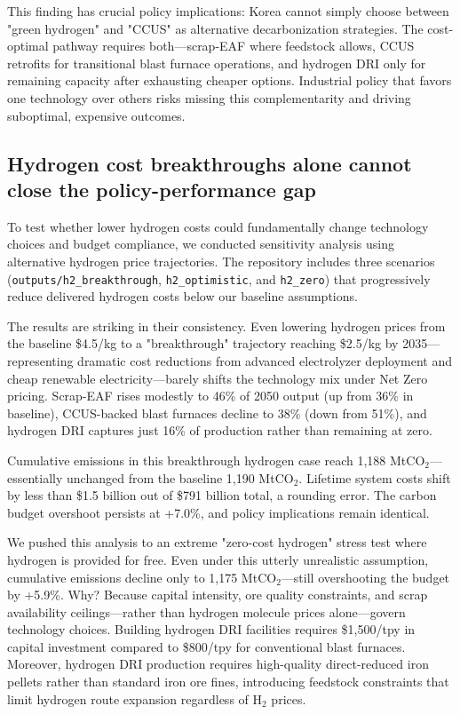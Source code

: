 This finding has crucial policy implications: Korea cannot simply choose between "green hydrogen" and "CCUS" as alternative decarbonization strategies. The cost-optimal pathway requires both—scrap-EAF where feedstock allows, CCUS retrofits for transitional blast furnace operations, and hydrogen DRI only for remaining capacity after exhausting cheaper options. Industrial policy that favors one technology over others risks missing this complementarity and driving suboptimal, expensive outcomes.

\subsection{Hydrogen cost breakthroughs alone cannot close the policy-performance gap}

To test whether lower hydrogen costs could fundamentally change technology choices and budget compliance, we conducted sensitivity analysis using alternative hydrogen price trajectories. The repository includes three scenarios (\texttt{outputs/h2\_breakthrough}, \texttt{h2\_optimistic}, and \texttt{h2\_zero}) that progressively reduce delivered hydrogen costs below our baseline assumptions.

The results are striking in their consistency. Even lowering hydrogen prices from the baseline \$4.5/kg to a "breakthrough" trajectory reaching \$2.5/kg by 2035—representing dramatic cost reductions from advanced electrolyzer deployment and cheap renewable electricity—barely shifts the technology mix under Net Zero pricing. Scrap-EAF rises modestly to 46\% of 2050 output (up from 36\% in baseline), CCUS-backed blast furnaces decline to 38\% (down from 51\%), and hydrogen DRI captures just 16\% of production rather than remaining at zero.

Cumulative emissions in this breakthrough hydrogen case reach 1,188 MtCO$_2$—essentially unchanged from the baseline 1,190 MtCO$_2$. Lifetime system costs shift by less than \$1.5 billion out of \$791 billion total, a rounding error. The carbon budget overshoot persists at +7.0\%, and policy implications remain identical.

We pushed this analysis to an extreme "zero-cost hydrogen" stress test where hydrogen is provided for free. Even under this utterly unrealistic assumption, cumulative emissions decline only to 1,175 MtCO$_2$—still overshooting the budget by +5.9\%. Why? Because capital intensity, ore quality constraints, and scrap availability ceilings—rather than hydrogen molecule prices alone—govern technology choices. Building hydrogen DRI facilities requires \$1,500/tpy in capital investment compared to \$800/tpy for conventional blast furnaces. Moreover, hydrogen DRI production requires high-quality direct-reduced iron pellets rather than standard iron ore fines, introducing feedstock constraints that limit hydrogen route expansion regardless of H$_2$ prices.

